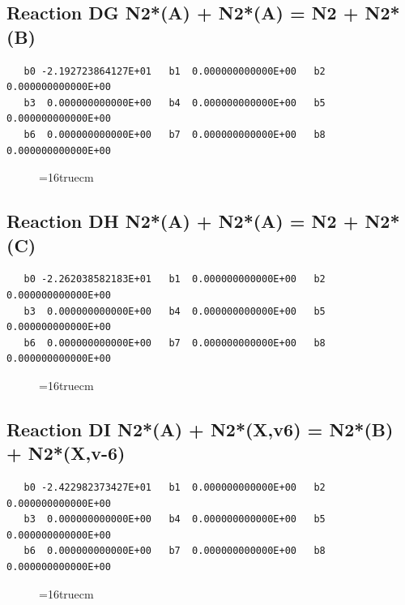 \documentclass[12pt,dvipdfm]{article}
\begin{document}
\subsection{
Reaction DG N2*(A) + N2*(A) = N2 + N2*(B) }
\begin{small}\begin{verbatim}
   b0 -2.192723864127E+01   b1  0.000000000000E+00   b2  0.000000000000E+00
   b3  0.000000000000E+00   b4  0.000000000000E+00   b5  0.000000000000E+00
   b6  0.000000000000E+00   b7  0.000000000000E+00   b8  0.000000000000E+00
\end{verbatim}\end{small}
\begin{figure}[h!] \label{n2rates}
\epsfxsize=16truecm
\end{figure}
\newpage

\subsection{
Reaction DH N2*(A) + N2*(A) = N2 + N2*(C) }
\begin{small}\begin{verbatim}
   b0 -2.262038582183E+01   b1  0.000000000000E+00   b2  0.000000000000E+00
   b3  0.000000000000E+00   b4  0.000000000000E+00   b5  0.000000000000E+00
   b6  0.000000000000E+00   b7  0.000000000000E+00   b8  0.000000000000E+00
\end{verbatim}\end{small}
\begin{figure}[h!] \label{n2rates}
\epsfxsize=16truecm
\end{figure}
\newpage

\subsection{
Reaction DI N2*(A) + N2*(X,v6) = N2*(B) + N2*(X,v-6) }
\begin{small}\begin{verbatim}
   b0 -2.422982373427E+01   b1  0.000000000000E+00   b2  0.000000000000E+00
   b3  0.000000000000E+00   b4  0.000000000000E+00   b5  0.000000000000E+00
   b6  0.000000000000E+00   b7  0.000000000000E+00   b8  0.000000000000E+00
\end{verbatim}\end{small}
\begin{figure}[h!] \label{n2rates}
\epsfxsize=16truecm
\end{figure}
\newpage
\end{document}
